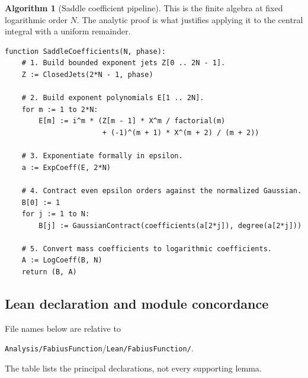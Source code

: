 \documentclass[11pt,oneside]{article}
\theoremstyle{definition}
\newtheorem{algorithm}[theorem]{Algorithm}
\theoremstyle{remark}
\newcommand{\repo}{\nolinkurl{Analysis/FabiusFunction}}
\begin{document}
\begin{algorithm}[Saddle coefficient pipeline]
\label{integration:alg:saddle-pipeline}
This is the finite algebra at fixed logarithmic order $N$.  The analytic proof is what
justifies applying it to the central integral with a uniform remainder.
\end{algorithm}
\begin{lstlisting}[style=pseudo]
function SaddleCoefficients(N, phase):
    # 1. Build bounded exponent jets Z[0 .. 2N - 1].
    Z := ClosedJets(2*N - 1, phase)

    # 2. Build exponent polynomials E[1 .. 2N].
    for m := 1 to 2*N:
        E[m] := i^m * (Z[m - 1] * X^m / factorial(m)
                       + (-1)^(m + 1) * X^(m + 2) / (m + 2))

    # 3. Exponentiate formally in epsilon.
    a := ExpCoeff(E, 2*N)

    # 4. Contract even epsilon orders against the normalized Gaussian.
    B[0] := 1
    for j := 1 to N:
        B[j] := GaussianContract(coefficients(a[2*j]), degree(a[2*j]))

    # 5. Convert mass coefficients to logarithmic coefficients.
    A := LogCoeff(B, N)
    return (B, A)
\end{lstlisting}

\subsection{Lean declaration and module concordance}
\label{integration:app:concordance}

File names below are relative to
\begin{center}
 \repo/\texttt{Lean/FabiusFunction/}.
\end{center}
The table lists the principal declarations, not every supporting lemma.
\end{document}
